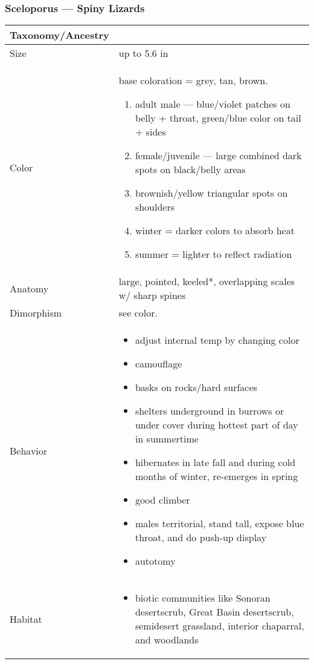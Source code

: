 \subsubsection{Sceloporus --- Spiny Lizards}
\begin{center}
\begin{longtabu} to 

	\hline
	Taxonomy/Ancestry &
	 \\
	\hline
	Size & 
	up to 5.6 in
	\\
	\hline
	Color &
	base coloration = grey, tan, brown.
	\begin{enumerate}
		\item adult male --- blue/violet patches on belly + throat, green/blue color on tail + sides
		\item female/juvenile --- large combined dark spots on black/belly areas
		\item brownish/yellow triangular spots on shoulders
		\item winter = darker colors to absorb heat
		\item summer = lighter to reflect radiation
	\end{enumerate}
	 \\
	\hline
	Anatomy &
	large, pointed, keeled*, overlapping scales w/ sharp spines
	 \\
	\hline
	Dimorphism & 
	see color.
	\\
	\hline
	Behavior & 
	\begin{itemize}[noitemsep]
		\item adjust internal temp by changing color
		\item camouflage
		\item basks on rocks/hard surfaces
		\item shelters underground in burrows or under cover during hottest part of day in summertime
		\item hibernates in late fall and during cold months of winter, re-emerges in spring
		\item good climber
		\item males territorial, stand tall, expose blue throat, and do push-up display
		\item autotomy
	\end{itemize}
	\\
	\hline
	Habitat & 
	\begin{itemize}[noitemsep]
		\item biotic communities like Sonoran desertscrub, Great Basin desertscrub, semidesert grassland, interior chaparral, and woodlands

\end{itemize}
\end{longtabu}
\end{center}
